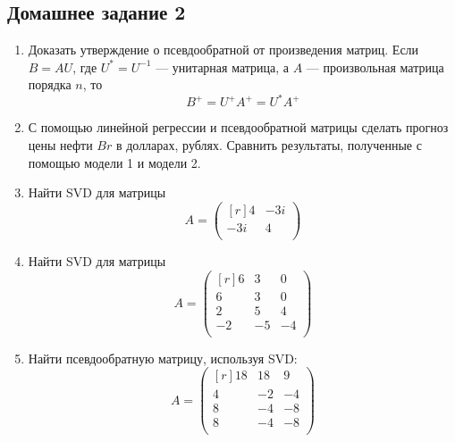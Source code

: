 \subsection{Домашнее задание 2}
\begin{enumerate}
    \item
    Доказать утверждение о псевдообратной от произведения матриц.
    Если $B=AU$, где $U^*=U^{-1}$ --- унитарная матрица, а $A$ --- произвольная матрица порядка $n$, то $$B^+=U^+A^+=U^*A^+$$ 
    \item
    С помощью линейной регрессии и псевдообратной матрицы сделать прогноз цены нефти $Br$ в долларах, рублях. Сравнить результаты, полученные с помощью модели 1 и модели 2.
    \item
    Найти SVD для матрицы\\
    \[A=\begin{pmatrix}[r]
    4 & -3i\\
    -3i & 4\\
    \end{pmatrix}\]
    \item
    Найти SVD для матрицы\\
    \[A=\begin{pmatrix}[r]
    6 & 3 & 0\\
    6 & 3 & 0\\
    2 & 5 & 4\\
    -2 & -5 & -4\\
    \end{pmatrix}\]
    \item
    Найти псевдообратную матрицу, используя SVD:\\
    \[A=\begin{pmatrix}[r]
    18 & 18 & 9\\
    4 & -2 & -4\\
    8 & -4 & -8\\
    8 & -4 & -8\\
    \end{pmatrix}\]
\end{enumerate}
~\\